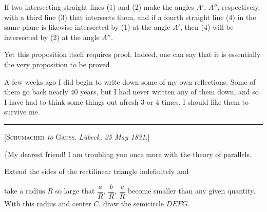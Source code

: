 

%
If two intersecting straight lines (1) and (2) make the angles $A'$, $A''$, respectively, with a third line (3) that intersects them, and if a fourth straight line (4) in the same plane is likewise intersected by (1) at the angle $A'$, then (4) will be intersected by (2) at the angle $A''$.

Yet this proposition itself requires proof. Indeed, one can say that it is essentially the very proposition to be proved.

A few weeks ago I did begin to write down some of my own reflections. Some of them go back nearly 40 years, but I had never written any of them down, and so I have had to think some things out afresh 3 or 4 times. I should like them to survive me.

\bigskip
\hrule
\bigskip

\begin{center}
[\textsc{Schumacher} \emph{to} \textsc{Gauss}. \emph{Lübeck, 25 May 1831.}]
\end{center}

\{My dearest friend! I am troubling you once more with the theory of parallels.

Extend the sides of the rectilinear triangle indefinitely and

\begin{center}

\end{center}

\noindent take a radius $R$ so large that $\dfrac{a}{R}$, $\dfrac{b}{R}$, $\dfrac{c}{R}$ become smaller than any given quantity. With this radius and center $C$, draw the semicircle $DEFG$.
